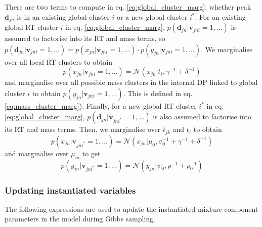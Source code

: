 \begin{enumerate}
\begin{dmath}
\end{dmath}
There are two terms to compute in eq. \ref{eq:global_cluster_marg}: whether peak $\mathbf{d}_{jn}$ is in an existing global cluster $i$ or a new global cluster $i^{*}$. For an existing global RT cluster $i$ in eq. \ref{eq:global_cluster_marg}, $p(\mathbf{d}_{jn}|\boldsymbol{v}_{jni}=1,...)$ is assumed to factorise into its RT and mass terms, so $p(\mathbf{d}_{jn}|\boldsymbol{v}_{jni}=1,...) = p(x_{jn}|\boldsymbol{v}_{jni}=1,...)\cdot p(y_{jn}|\boldsymbol{v}_{jni}=1,...)$. We marginalise over all local RT clusters to obtain
\begin{dmath}
p(x_{jn}|\boldsymbol{v}_{jni}=1,...)=\mathcal{N}(x_{jn}|t_{i},\gamma^{-1}+\delta^{-1})
\label{eq:existing_global_factors}
\end{dmath}
and marginalise over all possible mass clusters in the internal DP linked to global cluster $i$ to obtain $p(y_{jn}|\boldsymbol{v}_{jni}=1,...)$. This is defined in eq. \ref{eq:mass_cluster_marg}). 
Finally, for a new global RT cluster $i^{*}$ in eq. \ref{eq:global_cluster_marg}, $p(\mathbf{d}_{jn}|\boldsymbol{v}_{jni^{*}}=1,...)$ is also assumed to factorise into its RT and mass terms. Then, we marginalise over $t_{jk}$ and $t_{i}$ to obtain
\begin{dmath}
p(x_{jn}|\boldsymbol{v}_{jni^{*}}=1,...)=\mathcal{N}(x_{jn}|\mu_{0},\sigma_{0}^{-1}+\gamma^{-1}+\delta^{-1})
\end{dmath}
and marginalise over $\mu_{ia}$ to get 
\begin{dmath}
p(y_{jn}|\boldsymbol{v}_{jni^{*}}=1,...)=\mathcal{N}(y_{jn}|\psi_{0},\rho^{-1}+\rho_{0}^{-1})
\end{dmath}

\end{enumerate}

\subsubsection{Updating instantiated variables}

The following expressions are used to update the instantiated mixture component parameters in the model during Gibbs sampling.


